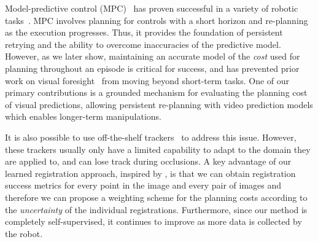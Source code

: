 
Model-predictive control (MPC)~\cite{camacho2013model} has proven successful in a variety of robotic tasks~\cite{shim2003decentralized,allibert2010predictive,howard2010receding,williams2017information,deep_mpc}.
MPC involves planning for controls with a short horizon and re-planning as the execution progresses.
Thus, it provides the foundation of persistent retrying and the ability to overcome inaccuracies of the predictive model. However, as we later show, maintaining an accurate model of the \emph{cost} used for planning throughout an episode is critical for success, and has prevented prior work on visual foresight~\cite{foresight,sna} from moving beyond short-term tasks.
One of our primary contributions is a grounded mechanism for evaluating the planning cost of visual predictions, allowing persistent re-planning with video prediction models which enables longer-term manipulations.

%



It is also possible to use off-the-shelf trackers~\cite{lucas1981iterative,brox2004high,babenko2009visual,mei2009robust} to address this issue. However, these trackers usually only have a limited capability to adapt to the domain they are applied to, and can lose track during occlusions. A key advantage of our learned registration approach, inspired by \cite{meister2017unflow}, is that we can obtain registration success metrics for every point in the image and every pair of images and therefore we can propose a weighting scheme for the planning costs according to the \emph{uncertainty} of the individual registrations. Furthermore, since our method is completely self-supervised, it continues to improve as more data is collected by the robot.


